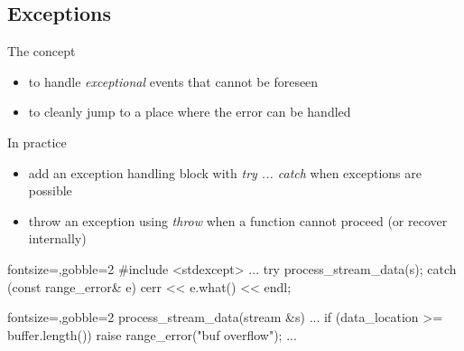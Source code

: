 \subsection[except]{Exceptions}

\begin{frame}[fragile]
  \begin{block}{The concept}
    \begin{itemize}
      \item to handle \textit{exceptional} events that cannot be foreseen
      \item to cleanly jump to a place where the error can be handled
    \end{itemize}
  \end{block}
  \begin{block}{In practice}
    \begin{itemize}
      \item add an exception handling block with {\it try ... catch} when exceptions are possible
      \item throw an exception using {\it throw} when a function cannot proceed (or recover internally)
    \end{itemize}
  \end{block}
  \begin{multicols}{2}
    \begin{cppcode*}{fontsize=\scriptsize,gobble=2}
      #include <stdexcept>
      ...
      try {
        process_stream_data(s);
      } catch (const range_error& e) {
        cerr << e.what() << endl;
      }
    \end{cppcode*}
    \columnbreak
    \begin{cppcode*}{fontsize=\scriptsize,gobble=2}
      process_stream_data(stream &s) {
        ...
        if (data_location >= buffer.length()) {
          raise range_error("buf overflow");
        }
        ...
      }
    \end{cppcode*}
  \end{multicols}
\end{frame}

